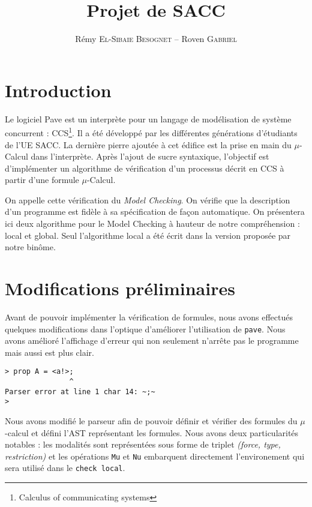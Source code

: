 \documentclass[a4paper]{article}
\title{Projet de SACC}
\author{Rémy \textsc{El-Sibaie Besognet} -- Roven \textsc{Gabriel}}
\begin{document}
\maketitle

\section{Introduction}

Le logiciel Pave est un interprète pour un langage de modélisation de
système concurrent : CCS\footnote{Calculus of communicating
systems}. Il a été développé par les différentes générations
d'étudiants de l'UE SACC. La dernière pierre ajoutée à cet édifice est
la prise en main du $\mu$-Calcul dans l'interprète. Après l'ajout de
sucre syntaxique, l'objectif est d'implémenter un algorithme de
vérification d'un processus décrit en CCS à partir d'une formule
$\mu$-Calcul.

On appelle cette vérification du \emph{Model Checking}. On vérifie
que la description d'un programme est fidèle à sa spécification de
façon automatique. On présentera ici deux algorithme pour le
Model Checking
à hauteur de notre compréhension : local et global. Seul
l'algorithme local a été écrit dans la version proposée par notre binôme.


\section{Modifications préliminaires}

Avant de pouvoir implémenter la vérification de formules, nous avons effectués
quelques modifications dans l'optique d'améliorer l'utilisation de \texttt{pave}.
Nous avons amélioré l'affichage d'erreur qui non seulement n'arrête pas le 
programme mais aussi est plus clair. 

\begin{verbatim}
> prop A = <a!>;
               ^
Parser error at line 1 char 14: ~;~
>
\end{verbatim}

Nous avons modifié le parseur afin de pouvoir définir et vérifier des formules du
$\mu$-calcul et défini l'AST représentant  les formules. Nous avons deux
particularités notables : les modalités sont représentées sous forme de triplet
\emph{(force, type, restriction)} et les opérations \texttt{Mu} et \texttt{Nu}
embarquent directement l'environement qui sera utilisé dans le \texttt{check local}.
\end{document}
